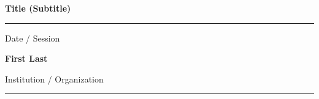 \documentclass{article}
\begin{document}
\newcommand{\makecover}{
\begin{flushleft}
    \huge\bfseries Title
    \Large \bfseries (Subtitle)
\end{flushleft}
    \rule{\linewidth}{5pt} %
    \begin{flushright}
            Date / Session
    \end{flushright}
\vfill
\begin{flushleft}
\Large \bfseries{First Last}

\Large{Institution / Organization}
\end{flushleft}
    \rule{\linewidth}{5pt}
\pagebreak
}

\makecover
\end{document}
